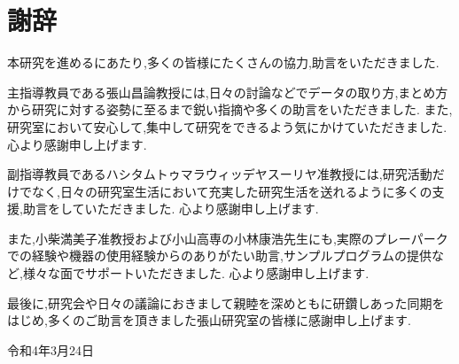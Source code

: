 \chapter*{謝辞}

本研究を進めるにあたり,多くの皆様にたくさんの協力,助言をいただきました.\par
主指導教員である張山昌論教授には,日々の討論などでデータの取り方,まとめ方から研究に対する姿勢に至るまで鋭い指摘や多くの助言をいただきました.
また,研究室において安心して,集中して研究をできるよう気にかけていただきました.
心より感謝申し上げます.\par
副指導教員であるハシタムトゥマラウィッデヤスーリヤ准教授には,研究活動だけでなく,日々の研究室生活において充実した研究生活を送れるように多くの支援,助言をしていただきました.
心より感謝申し上げます.\par
また,小柴満美子准教授および小山高専の小林康浩先生にも,実際のプレーパークでの経験や機器の使用経験からのありがたい助言,サンプルプログラムの提供など,様々な面でサポートいただきました.
心より感謝申し上げます.\par
最後に,研究会や日々の議論におきまして親睦を深めともに研鑽しあった同期をはじめ,多くのご助言を頂きました張山研究室の皆様に感謝申し上げます.\par
\begin{flushright}
  令和4年3月24日
\end{flushright}
